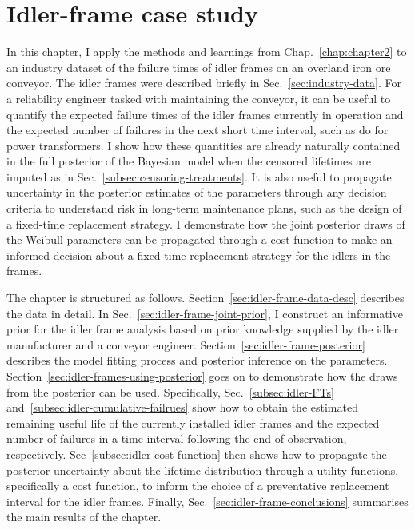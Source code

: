 \chapter{Idler-frame case study}\label{chap:chapter3}

In this chapter, I apply the methods and learnings from Chap.~\ref{chap:chapter2} to an industry dataset of the failure times of idler frames on an overland iron ore conveyor. The idler frames were described briefly in Sec.~\ref{sec:industry-data}. For a reliability engineer tasked with maintaining the conveyor, it can be useful to quantify the expected failure times of the idler frames currently in operation and the expected number of failures in the next short time interval, such as \citet{hong2009} do for power transformers. I show how these quantities are already naturally contained in the full posterior of the Bayesian model when the censored lifetimes are imputed as in Sec.~\ref{subsec:censoring-treatments}. It is also useful to propagate uncertainty in the posterior estimates of the parameters through any decision criteria to understand risk in long-term maintenance plans, such as the design of a fixed-time replacement strategy. I demonstrate how the joint posterior draws of the Weibull parameters can be propagated through a cost function to make an informed decision about a fixed-time replacement strategy for the idlers in the frames.

The chapter is structured as follows. Section~\ref{sec:idler-frame-data-desc} describes the data in detail. In Sec.~\ref{sec:idler-frame-joint-prior}, I construct an informative prior for the idler frame analysis based on prior knowledge supplied by the idler manufacturer and a conveyor engineer. Section~\ref{sec:idler-frame-posterior} describes the model fitting process and posterior inference on the parameters. Section~\ref{sec:idler-frames-using-posterior} goes on to demonstrate how the draws from the posterior can be used. Specifically, Sec.~\ref{subsec:idler-FTs} and~\ref{subsec:idler-cumulative-failrues} show how to obtain the estimated remaining useful life of the currently installed idler frames and the expected number of failures in a time interval following the end of observation, respectively. Sec~\ref{subsec:idler-cost-function} then shows how to propagate the posterior uncertainty about the lifetime distribution through a utility functions, specifically a cost function, to inform the choice of a preventative replacement interval for the idler frames. Finally, Sec.~\ref{sec:idler-frame-conclusions} summarises the main results of the chapter.


